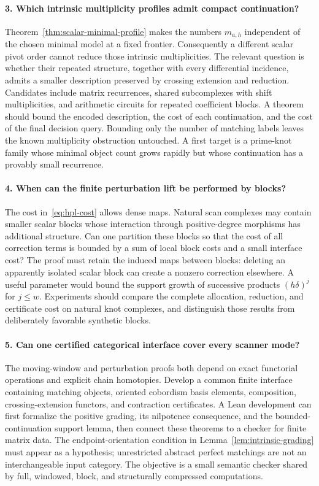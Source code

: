 \paragraph{3. Which intrinsic multiplicity profiles admit compact continuation?}
Theorem~\ref{thm:scalar-minimal-profile} makes the numbers $m_{a,h}$
independent of the chosen minimal model at a fixed frontier.  Consequently
a different scalar pivot order cannot reduce those intrinsic
multiplicities.  The relevant question is whether their repeated
structure, together with every differential incidence, admits a smaller
description preserved by crossing extension and reduction.
Candidates include matrix recurrences, shared subcomplexes with shift
multiplicities, and arithmetic circuits for repeated coefficient blocks.
A theorem should bound the encoded description, the cost of each
continuation, and the cost of the final decision query.  Bounding only
the number of matching labels leaves the known multiplicity obstruction
untouched.  A first target is a prime-knot family whose minimal object
count grows rapidly but whose continuation has a provably small
recurrence.

\paragraph{4. When can the finite perturbation lift be performed by blocks?}
The cost in~\eqref{eq:hpl-cost} allows dense maps.  Natural scan complexes
may contain smaller scalar blocks whose interaction through
positive-degree morphisms has additional structure.  Can one partition
these blocks so that the cost of all correction terms is bounded by a
sum of local block costs and a small interface cost?  The proof must
retain the induced maps between blocks: deleting an apparently isolated
scalar block can create a nonzero correction elsewhere.  A useful
parameter would bound the support growth of successive products
$(h\delta)^j$ for $j\leq w$.  Experiments should compare the complete
allocation, reduction, and certificate cost on natural knot complexes,
and distinguish those results from deliberately favorable synthetic
blocks.

\paragraph{5. Can one certified categorical interface cover every scanner mode?}
The moving-window and perturbation proofs both depend on exact
functorial operations and explicit chain homotopies.  Develop a common
finite interface containing matching objects, oriented cobordism basis
elements, composition, crossing-extension functors, and contraction
certificates.  A Lean development can first formalize the positive
grading, its nilpotence consequence, and the bounded-continuation
support lemma, then connect these theorems to a checker for finite
matrix data.  The endpoint-orientation condition in
Lemma~\ref{lem:intrinsic-grading} must appear as a hypothesis; unrestricted
abstract perfect matchings are not an interchangeable input category.
The objective is a small semantic checker shared by full, windowed,
block, and structurally compressed computations.

